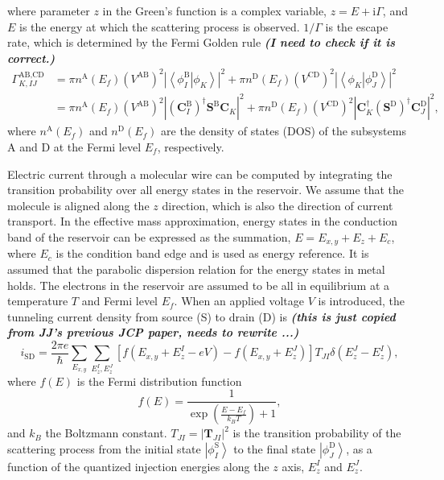 \documentclass[a4paper,11pt,twoside,openright]{book}
\newcommand{\fixme}[1]{\textbf{\textit{\color{red} #1}}}
\begin{document}
where parameter $z$ in the Green's function is a complex variable, $z=E+\text{i}\Gamma$,
and $E$ is the energy at which the scattering process is observed. $1/\Gamma$ is the escape rate,
which is determined by the Fermi Golden rule\cite{Jiang-JCP124-034708} \fixme{(I need to check if it is correct.)}
\begin{align}
  \label{eq-escape-rate}
  \Gamma_{K,IJ}^{\text{AB,CD}}
  &=\pi n^{\text{A}}(E_{f})\left(V^{\text{AB}}\right)^{2}\left|\left\langle\left.\phi_{I}^{\text{B}}\right|\phi_{K}\right\rangle\right|^{2}%
    +\pi n^{\text{D}}(E_{f})\left(V^{\text{CD}}\right)^{2}\left|\left\langle\phi_{K}\left|\phi_{J}^{\text{D}}\right.\right\rangle\right|^{2}\\
  &=\pi n^{\text{A}}(E_{f})\left(V^{\text{AB}}\right)^{2}%
    \left|\left(\mathbf{C}^{\text{B}}_{I}\right)^{\dagger}\mathbf{S}^{\text{B}}\mathbf{C}_{K}\right|^{2}%
    +\pi n^{\text{D}}(E_{f})\left(V^{\text{CD}}\right)^{2}%
    \left|\mathbf{C}_{K}^{\dagger}\left(\mathbf{S}^{\text{D}}\right)^{\dagger}\mathbf{C}^{\text{D}}_{J}\right|^{2},\nonumber
\end{align}
where $n^{\text{A}}(E_{f})$ and $n^{\text{D}}(E_{f})$ are the density of states (DOS) of the
subsystems A and D at the Fermi level $E_{f}$, respectively.

Electric current through a molecular wire can be computed by integrating the transition
probability over all energy states in the reservoir. We assume that the molecule is aligned
along the $z$ direction, which is also the direction of current transport. In the effective mass
approximation, energy states in the conduction band of the reservoir can be expressed as
the summation, $E=E_{x,y}+E_{z}+E_{c}$, where $E_{c}$ is the condition band edge and is used
as energy reference. It is assumed that the parabolic dispersion relation for the energy states
in metal holds. The electrons in the reservoir are assumed to be all in equilibrium at a temperature
$T$ and Fermi level $E_{f}$. When an applied voltage $V$ is introduced, the tunneling current
density from source (S) to drain (D) is\cite{Mujica-JCP101-6849,Wang-PCCP3-5017,Jiang-JCP124-034708}
\fixme{(this is just copied from JJ's previous JCP paper, needs to rewrite ...)}
\begin{equation}
  \label{eq-current}
  i_{\text{SD}}=\frac{2\pi e}{\hbar}\sum_{E_{x,y}}\sum_{E_{z}^{I},E_{z}^{J}}%
    \left[f\left(E_{x,y}+E_{z}^{I}-eV\right)-f\left(E_{x,y}+E_{z}^{J}\right)\right]%
    T_{JI}\delta\left(E_{z}^{J}-E_{z}^{I}\right),
\end{equation}
where $f(E)$ is the Fermi distribution function
\begin{equation}
  f(E)=\frac{1}{\exp\left(\frac{E-E_{f}}{k_{B}T}\right)+1},
\end{equation}
and $k_{B}$ the Boltzmann constant. $T_{JI}=\left|\mathbf{T}_{JI}\right|^{2}$ is the
transition probability of the scattering process from the initial state $\left|\phi_{I}^{\text{S}}\right\rangle$
to the final state $\left|\phi_{J}^{\text{D}}\right\rangle$, as a function of the quantized injection
energies along the $z$ axis, $E_{z}^{I}$ and $E_{z}^{J}$.
\end{document}

